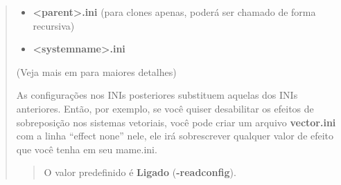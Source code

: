 \documentclass[letterpaper,10pt,brazil]{sphinxmanual}
\begin{document}
\begin{quote}
\begin{itemize}
\item {} 
\textbf{\textless{}parent\textgreater{}.ini}    (para clones apenas, poderá ser chamado de forma recursiva)

\item {} 
\textbf{\textless{}systemname\textgreater{}.ini}

\end{itemize}

(Veja mais em {\hyperref[advanced/multiconfig:advanced\string-multi\string-cfg]{}} para maiores detalhes)

As configurações nos INIs posteriores substituem aquelas dos INIs
anteriores.
Então, por exemplo, se você quiser desabilitar os efeitos de
sobreposição nos sistemas vetoriais, você pode criar um arquivo
\textbf{vector.ini} com a linha ``effect none'' nele, ele irá sobrescrever
qualquer valor de efeito que você tenha em seu mame.ini.
\begin{quote}

O valor predefinido é \textbf{Ligado} (\textbf{-readconfig}).
\end{quote}
\end{quote}
\end{document}
